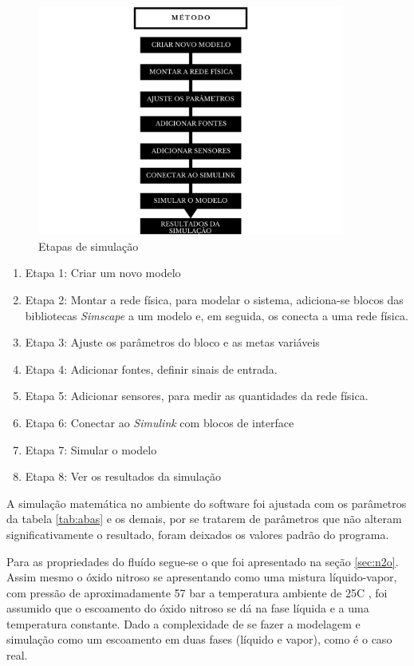\begin{figure}[h!]
\centering
\includegraphics[width=0.9\textwidth]{figuras/metodo.png}
\caption{Etapas de simulação}
\label{fig:metodologia}
\end{figure}

\begin{enumerate}
    \item Etapa 1: Criar um novo modelo 
    \item Etapa 2: Montar a rede física, para modelar o sistema, adiciona-se blocos das bibliotecas \textit{Simscape} a um modelo e, em seguida, os conecta a uma rede física. 
    \item Etapa 3: Ajuste os parâmetros do bloco e as metas variáveis
    \item Etapa 4: Adicionar fontes, definir sinais de entrada.
    \item Etapa 5: Adicionar sensores, para medir as quantidades da rede física. 
    \item Etapa 6: Conectar ao \textit{Simulink} com blocos de interface
    \item Etapa 7: Simular o modelo
    \item Etapa 8: Ver os resultados da simulação
\end{enumerate}


\par A simulação matemática no ambiente do software foi ajustada com os parâmetros da tabela \ref{tab:abas} e os demais, por se tratarem de parâmetros que não alteram significativamente o resultado, foram deixados os valores padrão do programa.

\par Para as propriedades do fluído segue-se o que foi apresentado na seção \ref{sec:n2o}. Assim mesmo o óxido nitroso se apresentando como uma mistura líquido-vapor, com pressão de aproximadamente 57 bar a temperatura ambiente de 25\degree C \cite{Propriedades_termofisicas}, foi assumido que o escoamento do óxido nitroso se dá na fase líquida e a uma temperatura constante. Dado a complexidade de se fazer a modelagem e simulação como um escoamento em duas fases (líquido e vapor), como é o caso real. 

